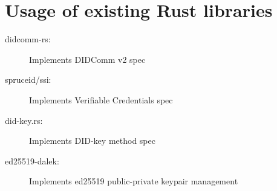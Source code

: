 \section{Usage of existing Rust libraries}

\begin{description}
    \item[didcomm-rs:] Implements DIDComm v2 spec
    \item[spruceid/ssi:] Implements Verifiable Credentials spec
    \item[did-key.rs:] Implements DID-key method spec
    \item[ed25519-dalek:] Implements ed25519 public-private keypair management
\end{description}
